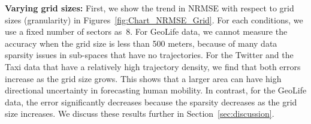 
\textbf{Varying grid sizes:} First, we show the trend in NRMSE with respect to grid sizes (granularity) in Figures~\ref{fig:Chart_NRMSE_Grid}.
For each conditions, we use a fixed number of sectors as~8. 
For GeoLife data, we cannot measure the accuracy when the grid size is less than 500 meters, because of many data sparsity issues in sub-spaces that have no trajectories.
For the Twitter and the Taxi data that have a relatively high trajectory density, we find that both errors increase as the grid size grows.
This shows that a larger area can have high directional uncertainty in forecasting human mobility.
In contrast, for the GeoLife data, the error significantly decreases because the sparsity decreases as the grid size increases.
We discuss these results further in Section~\ref{sec:discussion}.

